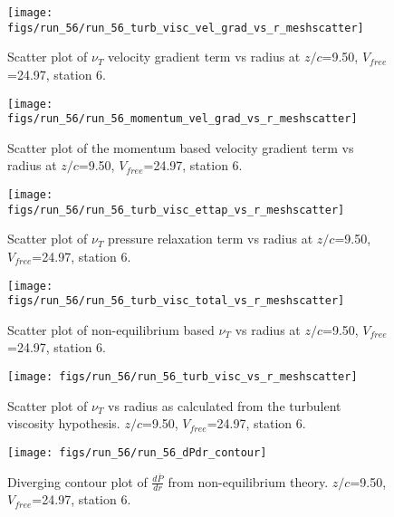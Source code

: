 \begin{figure}[H]
\centering
\texttt{[image: figs/run\_56/run\_56\_turb\_visc\_vel\_grad\_vs\_r\_meshscatter]}
\caption{Scatter plot of $\nu_T$ velocity gradient term vs radius at $z/c$=9.50, $V_{free}$=24.97, station 6.}
\end{figure}


\begin{figure}[H]
\centering
\texttt{[image: figs/run\_56/run\_56\_momentum\_vel\_grad\_vs\_r\_meshscatter]}
\caption{Scatter plot of the momentum based velocity gradient term vs radius at $z/c$=9.50, $V_{free}$=24.97, station 6.}
\end{figure}


\begin{figure}[H]
\centering
\texttt{[image: figs/run\_56/run\_56\_turb\_visc\_ettap\_vs\_r\_meshscatter]}
\caption{Scatter plot of $\nu_T$ pressure relaxation term vs radius at $z/c$=9.50, $V_{free}$=24.97, station 6.}
\end{figure}


\begin{figure}[H]
\centering
\texttt{[image: figs/run\_56/run\_56\_turb\_visc\_total\_vs\_r\_meshscatter]}
\caption{Scatter plot of non-equilibrium based $\nu_T$ vs radius at $z/c$=9.50, $V_{free}$=24.97, station 6.}
\end{figure}


\begin{figure}[H]
\centering
\texttt{[image: figs/run\_56/run\_56\_turb\_visc\_vs\_r\_meshscatter]}
\caption{Scatter plot of $\nu_T$ vs radius as calculated from the turbulent viscosity hypothesis. $z/c$=9.50, $V_{free}$=24.97, station 6.}
\end{figure}


\begin{figure}[H]
\centering
\texttt{[image: figs/run\_56/run\_56\_dPdr\_contour]}
\caption{Diverging contour plot of $\frac{d\bar{P}}{dr}$ from non-equilibrium theory. $z/c$=9.50, $V_{free}$=24.97, station 6.}
\end{figure}


